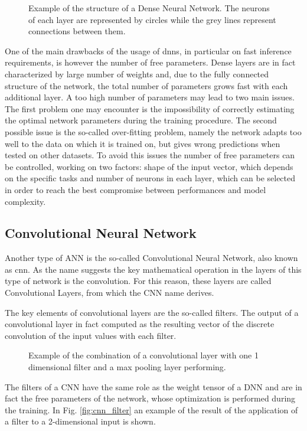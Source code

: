 \documentclass[../../main.tex]{subfiles}
\begin{document}
\begin{figure}[h]
    \centering
    
    \caption{Example of the structure of a Dense Neural Network. The neurons of each layer are represented by circles while the grey lines represent connections between them.}
    \label{fig:dnn_example}
\end{figure}

One of the main drawbacks of the usage of \acrshort{dnn}s, in particular on fast inference requirements, is however the number of free parameters. Dense layers are in fact characterized by large number of weights and, due to the fully connected structure of the network, the total number of parameters grows fast with each additional layer. 
A too high number of parameters may lead to two main issues. The first problem one may encounter is the impossibility of correctly estimating the optimal network parameters during the training procedure. The second possible issue is the so-called over-fitting problem, namely the network adapts too well to the data on which it is trained on, but gives wrong predictions when tested on other datasets.  
To avoid this issues the number of free parameters can be controlled, working on two factors:  shape of the input vector, which depends on the specific tasks and  number of neurons in each layer, which can be selected in order to reach the best compromise between performances and model complexity.
        
\subsection{Convolutional Neural Network}
\label{sec:CNN}

Another type of ANN is the so-called Convolutional Neural Network, also known as \acrshort{cnn}. As the name suggests the key mathematical operation in the layers of this type of network is the convolution. For this reason, these layers are called Convolutional Layers, from which the CNN name derives.

The key elements of convolutional layers are the so-called filters. The output of a convolutional layer in fact computed as the resulting vector of the discrete convolution of the input values with each filter. 

\begin{figure}
    \centering
    
    \caption{Example of the combination of a convolutional layer with one 1 dimensional filter and a max pooling layer performing.  }
    \label{fig:cnn_tot}
\end{figure}
The filters of a CNN have the same role as the weight tensor of a DNN and are in fact the free parameters of the network, whose optimization is performed during the training. In Fig. \ref{fig:cnn_filter} an example of the result of the application of a filter to a 2-dimensional input is shown.
\end{document}
